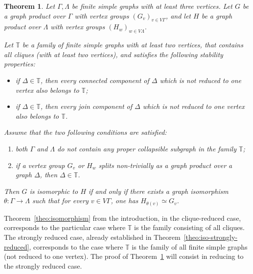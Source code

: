 \documentclass[a4paper,english,11pt]{article}
\newtheorem{theo}[de]{Theorem}
\theoremstyle{definition}
\theoremstyle{remark}
\begin{document}
\begin{theo}\label{theo:isomorphism-complete}
Let $\Gamma,\Lambda$ be finite simple graphs with at least three vertices. Let $G$ be a graph product over $\Gamma$ with vertex groups $(G_v)_{v\in V\Gamma}$, and let $H$ be a graph product over $\Lambda$ with vertex groups $(H_w)_{w\in V\Lambda}$. 

Let $\mathbb{T}$ be a family of finite simple graphs with at least two vertices, that contains all cliques (with at least two vertices), and satisfies the following stability properties:  
\begin{itemize}
    \item if $\Delta\in\mathbb{T}$, then every connected component of $\Delta$ which is not reduced to one vertex also belongs to $\mathbb{T}$;
    \item if $\Delta\in\mathbb{T}$, then every join component of $\Delta$ which is not reduced to one vertex also belongs to $\mathbb{T}$.
\end{itemize}
Assume that the two following conditions are satisfied:
\begin{enumerate}
    \item\label{hyp:Treduced1} both $\Gamma$ and $\Lambda$ do not contain any proper collapsible subgraph in the family $\mathbb{T}$;
    \item\label{hyp:Treduced2} if a vertex group $G_v$ or $H_w$ splits non-trivially as a graph product over a graph $\Delta$, then $\Delta\in\mathbb{T}$. 
\end{enumerate}
Then $G$ is isomorphic to $H$ if and only if there exists a graph isomorphism $\theta:\Gamma\to\Lambda$ such that for every $v\in V\Gamma$, one has $H_{\theta(v)}\simeq G_v$.
\end{theo}

Theorem~\ref{theo:isomorphism} from the introduction, in the clique-reduced case, corresponds to the particular case where $\mathbb{T}$ is the family consisting of all cliques. The strongly reduced case, already established in Theorem~\ref{theo:iso-strongly-reduced}, corresponds to the case where $\mathbb{T}$ is the family of all finite simple graphs (not reduced to one vertex). The proof of Theorem~\ref{theo:isomorphism-complete} will consist in reducing to the strongly reduced case.
\end{document}
